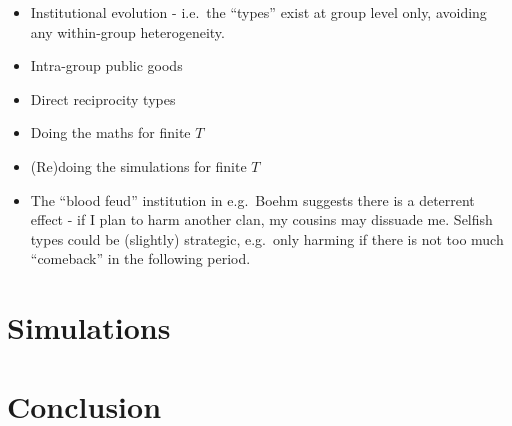 \documentclass[
]{article}
\providecommand{\tightlist}{%
  \setlength{\itemsep}{0pt}\setlength{\parskip}{0pt}}
\begin{document}
\begin{itemize}
\tightlist
\item
  Institutional evolution - i.e.~the ``types'' exist at group level
  only, avoiding any within-group heterogeneity.
\item
  Intra-group public goods
\item
  Direct reciprocity types
\item
  Doing the maths for finite \(T\)
\item
  (Re)doing the simulations for finite \(T\)
\item
  The ``blood feud'' institution in e.g.~Boehm suggests there is a
  deterrent effect - if I plan to harm another clan, my cousins may
  dissuade me. Selfish types could be (slightly) strategic, e.g.~only
  harming if there is not too much ``comeback'' in the following period.
\end{itemize}

\hypertarget{simulations}{%
\section{Simulations}\label{simulations}}

\hypertarget{conclusion}{%
\section{Conclusion}\label{conclusion}}
\end{document}

